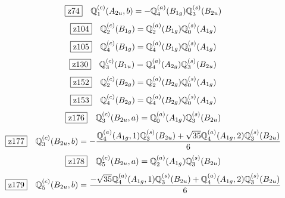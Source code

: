\documentclass[fleqn,10pt,landscape]{jsarticle}
\begin{document}
\begin{dmath*}
\hspace*{3mm}\fbox{z74}\quad \mathbb{Q}_{1}^{(c)}(A_{2u},b)=- \mathbb{Q}_{4}^{(a)}(B_{1g}) \mathbb{Q}_{3}^{(s)}(B_{2u})
\end{dmath*}
\begin{dmath*}
\hspace*{3mm}\fbox{z104}\quad \mathbb{Q}_{2}^{(c)}(B_{1g})=\mathbb{Q}_{2}^{(a)}(B_{1g}) \mathbb{Q}_{0}^{(s)}(A_{1g})
\end{dmath*}
\begin{dmath*}
\hspace*{3mm}\fbox{z105}\quad \mathbb{Q}_{4}^{(c)}(B_{1g})=\mathbb{Q}_{4}^{(a)}(B_{1g}) \mathbb{Q}_{0}^{(s)}(A_{1g})
\end{dmath*}
\begin{dmath*}
\hspace*{3mm}\fbox{z130}\quad \mathbb{Q}_{3}^{(c)}(B_{1u})=\mathbb{Q}_{4}^{(a)}(A_{2g}) \mathbb{Q}_{3}^{(s)}(B_{2u})
\end{dmath*}
\begin{dmath*}
\hspace*{3mm}\fbox{z152}\quad \mathbb{Q}_{2}^{(c)}(B_{2g})=\mathbb{Q}_{2}^{(a)}(B_{2g}) \mathbb{Q}_{0}^{(s)}(A_{1g})
\end{dmath*}
\begin{dmath*}
\hspace*{3mm}\fbox{z153}\quad \mathbb{Q}_{4}^{(c)}(B_{2g})=\mathbb{Q}_{4}^{(a)}(B_{2g}) \mathbb{Q}_{0}^{(s)}(A_{1g})
\end{dmath*}
\begin{dmath*}
\hspace*{3mm}\fbox{z176}\quad \mathbb{Q}_{3}^{(c)}(B_{2u},a)=\mathbb{Q}_{0}^{(a)}(A_{1g}) \mathbb{Q}_{3}^{(s)}(B_{2u})
\end{dmath*}
\begin{dmath*}
\hspace*{3mm}\fbox{z177}\quad \mathbb{Q}_{3}^{(c)}(B_{2u},b)=- \frac{\mathbb{Q}_{4}^{(a)}(A_{1g},1) \mathbb{Q}_{3}^{(s)}(B_{2u}) + \sqrt{35} \mathbb{Q}_{4}^{(a)}(A_{1g},2) \mathbb{Q}_{3}^{(s)}(B_{2u})}{6}
\end{dmath*}
\begin{dmath*}
\hspace*{3mm}\fbox{z178}\quad \mathbb{Q}_{5}^{(c)}(B_{2u},a)=\mathbb{Q}_{2}^{(a)}(A_{1g}) \mathbb{Q}_{3}^{(s)}(B_{2u})
\end{dmath*}
\begin{dmath*}
\hspace*{3mm}\fbox{z179}\quad \mathbb{Q}_{5}^{(c)}(B_{2u},b)=\frac{- \sqrt{35} \mathbb{Q}_{4}^{(a)}(A_{1g},1) \mathbb{Q}_{3}^{(s)}(B_{2u}) + \mathbb{Q}_{4}^{(a)}(A_{1g},2) \mathbb{Q}_{3}^{(s)}(B_{2u})}{6}
\end{dmath*}
\end{document}
